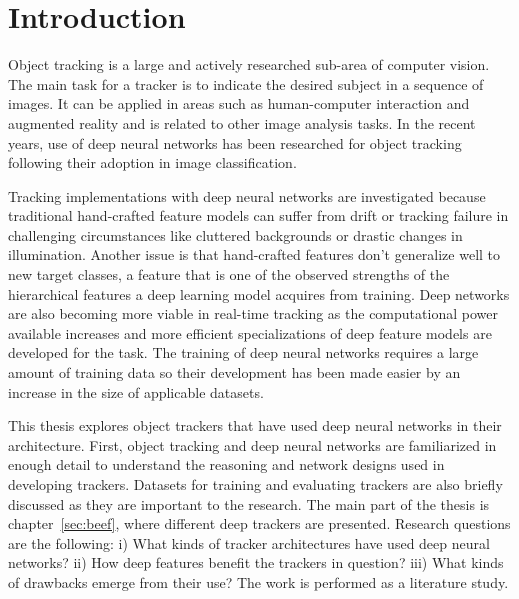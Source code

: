 \section{Introduction}
Object tracking is a large and actively researched sub-area of computer vision. The main task for a tracker is to indicate the desired subject in a sequence of images. It can be applied in areas such as human-computer interaction and augmented reality and is related to other image analysis tasks. In the recent years, use of deep neural networks has been researched for object tracking following their adoption in image classification.

Tracking implementations with deep neural networks are investigated because traditional hand-crafted feature models can suffer from drift or tracking failure in challenging circumstances like cluttered backgrounds or drastic changes in illumination. Another issue is that hand-crafted features don’t generalize well to new target classes, a feature that is one of the observed strengths of the hierarchical features a deep learning model acquires from training. Deep networks are also becoming more viable in real-time tracking as the computational power available increases and more efficient specializations of deep feature models are developed for the task. The training of deep neural networks requires a large amount of training data so their development has been made easier by an increase in the size of applicable datasets.

This thesis explores object trackers that have used deep neural networks in their architecture. First, object tracking and deep neural networks are familiarized in enough detail to understand the reasoning and network designs used in developing trackers. Datasets for training and evaluating trackers are also briefly discussed as they are important to the research. The main part of the thesis is chapter~\ref{sec:beef}, where different deep trackers are presented. Research questions are the following: i) What kinds of tracker architectures have used deep neural networks? ii) How deep features benefit the trackers in question? iii) What kinds of drawbacks emerge from their use? The work is performed as a literature study.
